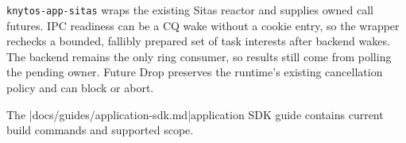 \texttt{knytos-app-sitas} wraps the existing Sitas reactor and supplies owned
call futures. IPC readiness can be a CQ wake without a cookie entry, so the
wrapper rechecks a bounded, fallibly prepared set of task interests after
backend wakes. The backend remains the only ring consumer, so results still come
from polling the pending owner. Future Drop preserves the runtime's existing
cancellation policy and can block or abort.

The \repofiletext|docs/guides/application-sdk.md|{application SDK guide}
contains current build commands and supported scope.

\endinput

